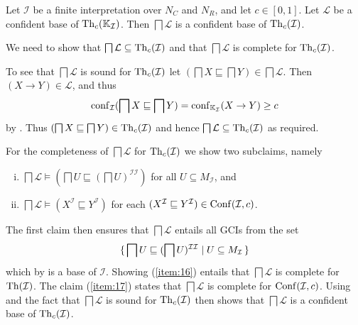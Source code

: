 \begin{Theorem}
  \label{thm:confident-bases-of-GCIs-from-confident-bases-of-implications}
  Let $\mathcal{I}$ be a finite interpretation over $N_C$ and $N_R$, and let $c \in
  [0,1]$.  Let $\mathcal{L}$ be a confident base of $\operatorname{Th}_c({\mathbb{K}}_{\mathcal{I}})$.  Then
  $\bigsqcap \mathcal{L}$ is a confident base of $\operatorname{Th}_c(\mathcal{I})$.
\end{Theorem}
\begin{Proof}
  We need to show that $\bigsqcap \mathcal{L} \subseteq \operatorname{Th}_c(\mathcal{I})$ and that
  $\bigsqcap \mathcal{L}$ is complete for $\operatorname{Th}_c(\mathcal{I})$.

  To see that $\bigsqcap \mathcal{L}$ is sound for $\operatorname{Th}_c(\mathcal{I})$ let $(\bigsqcap X
  \sqsubseteq \bigsqcap Y) \in \bigsqcap \mathcal{L}$.  Then $(X \to Y) \in \mathcal{L}$,
  and thus
  \begin{equation*}
    \operatorname{conf}_{\mathcal{I}}(\bigsqcap X \sqsubseteq \bigsqcap Y) = \operatorname{conf}_{{\mathbb{K}}_{\mathcal{I}}}(X \to Y) \ge c
  \end{equation*}
  by .  Thus
  $(\bigsqcap X \sqsubseteq \bigsqcap Y) \in \operatorname{Th}_c(\mathcal{I})$ and hence $\bigsqcap
  \mathcal{L} \subseteq \operatorname{Th}_c(\mathcal{I})$ as required.

  For the completeness of $\bigsqcap \mathcal{L}$ for $\operatorname{Th}_c(\mathcal{I})$ we show two
  subclaims, namely
  \begin{enumerate}[i. ]
  \item\label{item:16} $\bigsqcap \mathcal{L} \models (\bigsqcap U \sqsubseteq (\bigsqcap
    U)^{\mathcal{I}\mathcal{I}})$ for all $U \subseteq M_{\mathcal{I}}$, and
  \item\label{item:17} $\bigsqcap \mathcal{L} \models (X^{\mathcal{I}} \sqsubseteq
    Y^{\mathcal{I}})$ for each $(X^{\mathcal{I}} \sqsubseteq Y^{\mathcal{I}}) \in
    \operatorname{Conf}(\mathcal{I}, c)$.
  \end{enumerate}
  The first claim then ensures that $\bigsqcap \mathcal{L}$ entails all GCIs from the set
  \begin{equation*}
    {\ensuremath{\{\, \bigsqcap U \sqsubseteq (\bigsqcap U)^{\mathcal{I}\mathcal{I}} \mid U \subseteq
      M_{\mathcal{I}} \,\}}}
  \end{equation*}
  which by  is a base of $\mathcal{I}$.  Showing (\ref{item:16})
  entails that $\bigsqcap \mathcal{L}$ is complete for $\operatorname{Th}(\mathcal{I})$.  The claim
  (\ref{item:17}) states that $\bigsqcap \mathcal{L}$ is complete for $\operatorname{Conf}(\mathcal{I},
  c)$.  Using  and the fact that $\bigsqcap
  \mathcal{L}$ is sound for $\operatorname{Th}_c(\mathcal{I})$ then shows that $\bigsqcap \mathcal{L}$
  is a confident base of $\operatorname{Th}_c(\mathcal{I})$.


\end{Proof}
